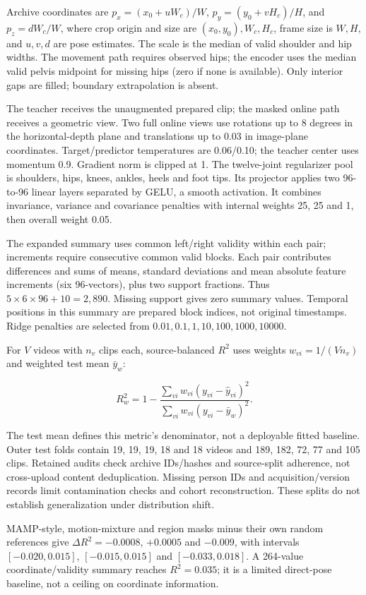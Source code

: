 \documentclass{article}
\begin{document}
Archive coordinates are \(p_x=(x_0+uW_c)/W\), \(p_y=(y_0+vH_c)/H\), and
\(p_z=dW_c/W\), where crop origin and size are \((x_0,y_0),W_c,H_c\),
frame size is \(W,H\), and \(u,v,d\) are pose estimates. The scale is
the median of valid shoulder and hip widths. The movement path requires
observed hips; the encoder uses the median valid pelvis midpoint for
missing hips (zero if none is available). Only interior gaps are filled;
boundary extrapolation is absent.

The teacher receives the unaugmented prepared clip; the masked online
path receives a geometric view. Two full online views use rotations up
to 8 degrees in the horizontal-depth plane and translations up to 0.03
in image-plane coordinates. Target/predictor temperatures are 0.06/0.10;
the teacher center uses momentum 0.9. Gradient norm is clipped at 1. The
twelve-joint regularizer pool is shoulders, hips, knees, ankles, heels
and foot tips. Its projector applies two 96-to-96 linear layers
separated by GELU, a smooth activation. It combines invariance, variance
and covariance penalties with internal weights 25, 25 and 1, then
overall weight 0.05.

The expanded summary uses common left/right validity within each pair;
increments require consecutive common valid blocks. Each pair
contributes differences and sums of means, standard deviations and mean
absolute feature increments (six 96-vectors), plus two support
fractions. Thus \(5\times6\times96+10=2,890\). Missing support gives
zero summary values. Temporal positions in this summary are prepared
block indices, not original timestamps. Ridge penalties are selected
from \(0.01,0.1,1,10,100,1000,10000\).

For \(V\) videos with \(n_v\) clips each, source-balanced \(R^2\) uses
weights \(w_{vi}=1/(Vn_v)\) and weighted test mean \(\bar y_w\):

\[R_w^2=1-\frac{\sum_{vi}w_{vi}(y_{vi}-\hat y_{vi})^2}{\sum_{vi}w_{vi}(y_{vi}-\bar y_w)^2}.\]

The test mean defines this metric's denominator, not a deployable fitted
baseline. Outer test folds contain 19, 19, 19, 18 and 18 videos and 189,
182, 72, 77 and 105 clips. Retained audits check archive IDs/hashes and
source-split adherence, not cross-upload content deduplication. Missing
person IDs and acquisition/version records limit contamination checks
and cohort reconstruction. These splits do not establish generalization
under distribution shift.

MAMP-style, motion-mixture and region masks minus their own random
references give \(\Delta R^2=-0.0008\), \(+0.0005\) and \(-0.009\), with
intervals \([-0.020,0.015]\), \([-0.015,0.015]\) and \([-0.033,0.018]\).
A 264-value coordinate/validity summary reaches \(R^2=0.035\); it is a
limited direct-pose baseline, not a ceiling on coordinate information.
\end{document}

